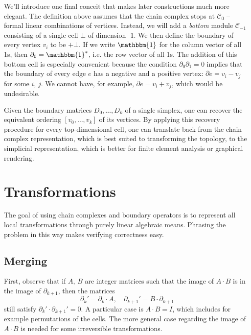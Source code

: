 \documentclass[twocolumn]{article}
\begin{document}
We'll introduce one final conceit that makes later constructions much more elegant.
The definition above assumes that the chain complex stops at $\mathscr{C}_0$ -- formal linear combinations of vertices.
Instead, we will add a \emph{bottom} module $\mathscr{C}_{-1}$ consisting of a single cell $\bot$ of dimension -1.
We then define the boundary of every vertex $v_i$ to be $+\bot$.
If we write $\mathbbm{1}$ for the column vector of all 1s, then $\partial_0 = \mathbbm{1}^*$, i.e. the row vector of all 1s.
The addition of this bottom cell is especially convenient because the condition $\partial_0\partial_1 = 0$ implies that the boundary of every edge $e$ has a negative and a positive vertex: $\partial e = v_i - v_j$ for some $i$, $j$.
We cannot have, for example, $\partial e = v_i + v_j$, which would be undesirable.

Given the boundary matrices $D_0, \ldots, D_k$ of a single simplex, one can recover the equivalent ordering $[v_0, \ldots, v_k]$ of its vertices.
By applying this recovery procedure for every top-dimensional cell, one can translate back from the chain complex representation, which is best suited to transforming the topology, to the simplicial representation, which is better for finite element analysis or graphical rendering.


\section{Transformations}

The goal of using chain complexes and boundary operators is to represent all local transformations through purely linear algebraic means.
Phrasing the problem in this way makes verifying correctness easy.

\subsection{Merging}

First, observe that if $A$, $B$ are integer matrices such that the image of $A\cdot B$ is in the image of $\partial_{k + 1}$, then the matrices
\begin{equation}
    \partial_k' = \partial_k\cdot A, \quad \partial_{k + 1}' = B\cdot\partial_{k + 1}
\end{equation}
still satisfy $\partial_k'\cdot\partial_{k + 1}' = 0$.
A particular case is $A\cdot B = I$, which includes for example permutations of the cells.
The more general case regarding the image of $A\cdot B$ is needed for some irreversible transformations.
\end{document}
